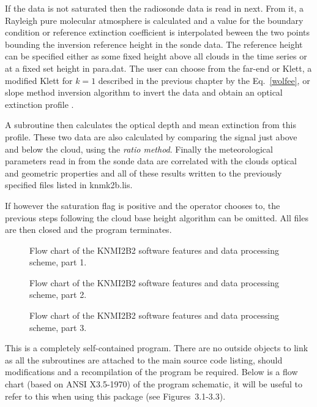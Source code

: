 If the data is not saturated then the radiosonde 
data is read in next. From it, a Rayleigh pure molecular
atmosphere is calculated and a value for the boundary condition or
reference extinction coefficient is interpolated beween the two 
points bounding the inversion reference height in the sonde data.
The reference height can be specified either as some fixed height
above all clouds in the time series or at a fixed set height in para.dat. 
The user can choose from the far-end or Klett, a 
modified Klett for $k=1$ described in the previous
chapter by the Eq.~{\ref{wolfee}}, or slope method inversion 
algorithm to invert the data and 
obtain an optical extinction profile \cite{jdk1}.

A subroutine then calculates the optical depth and mean
extinction from this profile. These two data are also calculated
by comparing the signal just above and below the cloud, using the
{\em ratio method}. Finally the meteorological parameters read in from the
sonde data are correlated with the clouds optical and geometric
properties and all of these results written to the previously specified 
files listed in knmk2b.lis.

If however the saturation flag is positive and the operator chooses to, 
the previous steps following the cloud base height algorithm can be omitted.
All files are then closed and the program terminates.

\begin{figure}
\vspace{8.0in}
\caption{Flow chart of the KNMI2B2 software features and 
data processing scheme, part 1.} 
\end{figure}

\begin{figure}
\vspace{8.0in}
\caption{Flow chart of the KNMI2B2 software features and 
data processing scheme, part 2.} 
\end{figure}

\begin{figure}
\vspace{8.0in}
\caption{Flow chart of the KNMI2B2 software features and 
data processing scheme, part 3.} 
\end{figure}

This is a completely self-contained program. There are no outside
objects to link as all the subroutines are attached to the main source
code listing, should modifications and a recompilation of the program be
required. Below is a flow chart (based on ANSI X3.5-1970) 
of the program schematic, it will be useful
to refer to this when using this package (see Figures~{3.1-3.3}).

